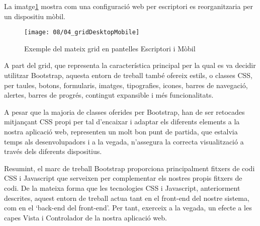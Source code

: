     La imatge\ref{img:gridAdapted} mostra com una configuració web per escriptori es reorganitzaria per un dispositiu mòbil.

    \begin{figure}[h]
        \texttt{[image: 08/04\_gridDesktopMobile]}
        \centering
        \caption{Exemple del mateix grid en pantelles Escriptori i Mòbil}\label{img:gridAdapted}
    \end{figure}

    A part del grid, que representa la característica principal per la qual es va decidir utilitzar Bootstrap, aquesta entorn de treball també ofereix estils, o classes CSS, per taules, botons, formularis, imatges, tipografies, icones, barres de navegació, alertes, barres de progrés, contingut expansible i més funcionalitats.

    A pesar que la majoria de classes oferides per Bootstrap, han de ser retocades mitjançant CSS propi per tal d'encaixar i adaptar els diferents elements a la nostra aplicació web, representen un molt bon punt de partida, que estalvia temps als desenvolupadors i a la vegada, n'assegura la correcta visualització a través dels diferents dispositius.

    Resumint, el marc de treball Bootstrap proporciona principalment fitxers de codi CSS i Javascript que serveixen per complementar els nostres propis fitxers de codi. De la mateixa forma que les tecnologies CSS i Javascript, anteriorment descrites, aquest entorn de treball actua tant en el front-end del nostre sistema, com en el `back-end del front-end’. Per tant, exerceix a la vegada, un efecte a les capes Vista i Controlador de la nostra aplicació web.
